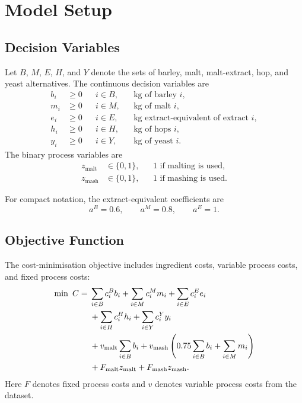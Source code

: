 \section{Model Setup}
\label{sec:model}

\subsection{Decision Variables}
\label{sec:decision-variables}
Let $B$, $M$, $E$, $H$, and $Y$ denote the sets of barley, malt, malt-extract, hop, and yeast alternatives. The continuous decision variables are
\begin{align*}
  b_i &\geq 0 && i \in B, && \text{kg of barley } i,\\
  m_i &\geq 0 && i \in M, && \text{kg of malt } i,\\
  e_i &\geq 0 && i \in E, && \text{kg extract-equivalent of extract } i,\\
  h_i &\geq 0 && i \in H, && \text{kg of hops } i,\\
  y_i &\geq 0 && i \in Y, && \text{kg of yeast } i.
\end{align*}
The binary process variables are
\begin{align*}
  z_{\mathrm{malt}} &\in \{0,1\}, && \text{1 if malting is used},\\
  z_{\mathrm{mash}} &\in \{0,1\}, && \text{1 if mashing is used}.
\end{align*}

For compact notation, the extract-equivalent coefficients are
\begin{equation}
  a^B = 0.6,\qquad a^M = 0.8,\qquad a^E = 1.
  \label{eq:extract-coefficients}
\end{equation}

\subsection{Objective Function}
\label{sec:objective}
The cost-minimisation objective includes ingredient costs, variable process costs, and fixed process costs:
\begin{align}
\min\ C ={}&
  \sum_{i \in B} c^B_i b_i
  + \sum_{i \in M} c^M_i m_i
  + \sum_{i \in E} c^E_i e_i \notag\\
& + \sum_{i \in H} c^H_i h_i
  + \sum_{i \in Y} c^Y_i y_i \notag\\
& + v_{\mathrm{malt}}\sum_{i \in B} b_i
  + v_{\mathrm{mash}}\left(0.75\sum_{i \in B}b_i+\sum_{i \in M}m_i\right) \notag\\
& + F_{\mathrm{malt}}z_{\mathrm{malt}}
  + F_{\mathrm{mash}}z_{\mathrm{mash}}.
  \label{eq:objective-cost}
\end{align}
Here $F$ denotes fixed process costs and $v$ denotes variable process costs from the dataset.

